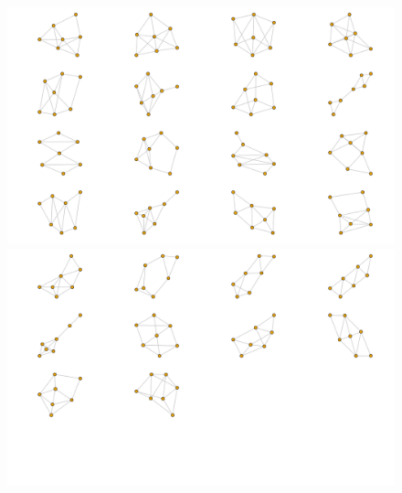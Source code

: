 \begin{figure}[h!]
	\subfloat
	{\includegraphics[width=0.95\linewidth]{atlas/atlas7-14.png}} \\
	\subfloat
    {\includegraphics[width=0.95\linewidth]{atlas/atlas7-15.png}}
\end{figure}